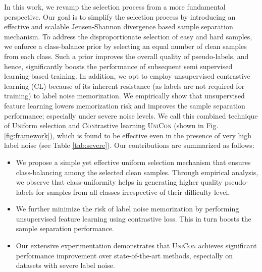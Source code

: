 \documentclass[10pt,twocolumn,letterpaper]{article}
\begin{document}
In this work, we revamp the selection process from a more fundamental perspective. Our goal is to simplify the selection process by introducing an effective and scalable Jensen-Shannon divergence based sample separation mechanism. To address the disproportionate selection of easy and hard samples, we enforce a class-balance prior by selecting an equal number of clean samples from each class. Such a prior improves the overall quality of pseudo-labels, and hence, significantly boosts the performance of subsequent semi supervised learning-based training. In addition, we opt to employ unsupervised contrastive learning (CL) because of its inherent resistance (as labels are not required for training) to label noise memorization. We empirically show that unsupervised feature learning lowers memorization risk and improves the sample separation performance; especially under severe noise levels. We call this combined technique of \textsc{Uni}form selection and \textsc{Con}trastive learning \textsc{UniCon} (shown in Fig. \ref{fig:framework}), which is found to be effective even in the presence of very high label noise (see Table \ref{tab:severe}). Our contributions are summarized as follows:






\begin{itemize}
    \vspace{-2mm}
    \item We propose a simple yet effective uniform selection mechanism that ensures class-balancing among the selected clean samples. Through empirical analysis, we observe that class-uniformity helps in generating higher quality pseudo-labels for samples from all classes irrespective of their difficulty level. 

    \vspace{-2mm}
    \item We further minimize the risk of label noise memorization by performing unsupervised feature learning using contrastive loss. This in turn boosts the sample separation performance.
    
    \vspace{-2mm}
    \item Our extensive experimentation demonstrates that \textsc{UniCon} achieves significant performance improvement over state-of-the-art methods, especially on datasets with severe label noise.  
\end{itemize}
\end{document}
